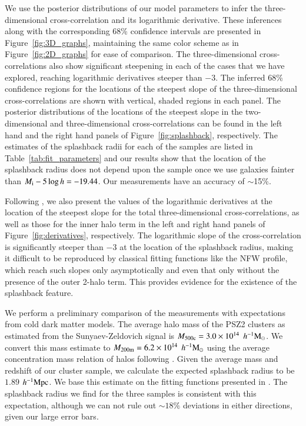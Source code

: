 \documentclass[iop, apjl, twocolappendix, numberedappendix]{emulateapj}
\def\mpch{h^{-1}{\rm Mpc}}
\def\msunh{h^{-1}{\rm M_{\odot}}}
\begin{document}
We use the posterior distributions of our model parameters to infer
the three-dimensional cross-correlation and its logarithmic
derivative. These inferences along with the corresponding 68\%
confidence intervals are presented in Figure~\ref{fig:3D_graphs},
maintaining the same color scheme as in Figure~\ref{fig:2D_graphs}
for ease of comparison. The three-dimensional cross-correlations
also show significant steepening in each of the cases that we have
explored, reaching logarithmic derivatives steeper than $-3$. The
inferred 68\% confidence regions for the locations of the steepest
slope of the three-dimensional cross-correlations are shown with
vertical, shaded regions in each panel. The posterior
distributions of the locations of the steepest slope in the
two-dimensional and three-dimensional cross-correlations can be
found in the left hand and the right hand panels of
Figure~\ref{fig:splashback}, respectively. The estimates of the splashback radii
for each of the samples are listed in Table~\ref{tab:fit_parameters}
and our results show that the location of the splashback radius does
not depend upon the sample once we use galaxies fainter than $M_{\rm
i}-5\log h=-19.44$. Our measurements have an accuracy of $\sim$15\%.

Following \citet{baxter2017halo}, we also present the values of the
logarithmic derivatives at the location of the steepest slope for
the total three-dimensional cross-correlations, as well as those for
the inner halo term in the left and right hand panels of
Figure~\ref{fig:derivatives}, respectively. The logarithmic slope of the 
cross-correlation is significantly steeper than $-3$ at the location 
of the splashback radius, making it difficult to
be reproduced by classical fitting functions like the NFW profile,
which reach such slopes only asymptotically and even that only
without the presence of the outer 2-halo term. This provides
evidence for the existence of the splashback feature.

We perform a preliminary comparison of the measurements with
expectations from cold dark matter models. The average halo mass of
the PSZ2 clusters as estimated from the Sunyaev-Zeldovich signal
is $M_{\rm 500c}=3.0\times10^{14}$ $\msunh$. We convert this mass
estimate to $M_{\rm 200m}=6.2\times10^{14}$ $\msunh$ using the average
concentration mass relation of halos following
\citet{HuKravtsov:2003}. Given the average mass and redshift of our
cluster sample, we calculate the expected splashback radius to be
$1.89$ $\mpch$. We base this estimate on the fitting functions
presented in \citet{more2015splashback}. The splashback radius we
find for the three samples is consistent with this expectation,
although we can not rule out $\sim 18\%$ deviations in either directions,
given our large error bars.
\end{document}
